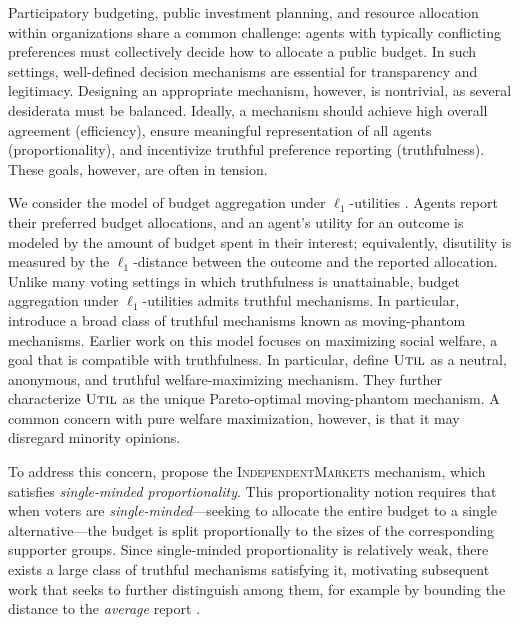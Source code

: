 \documentclass[11pt]{article}
\newcommand{\IM}{\textsc{IndependentMarkets} }
\newcommand{\Ut}{\textsc{Util} }
\begin{document}
Participatory budgeting, public investment planning, and resource allocation within organizations share a common challenge: agents with typically conflicting preferences must collectively decide how to allocate a public budget. In such settings, well-defined decision mechanisms are essential for transparency and legitimacy. Designing an appropriate mechanism, however, is nontrivial, as several desiderata must be balanced. Ideally, a mechanism should achieve high overall agreement (efficiency), ensure meaningful representation of all agents (proportionality), and incentivize truthful preference reporting (truthfulness). These goals, however, are often in tension.


We consider the model of budget aggregation under $\ell_1$-utilities \cite{lindner2008midpoint,goel2019knapsack}. Agents report their preferred budget allocations, and an agent’s utility for an outcome is modeled by the amount of budget spent in their interest; equivalently, disutility is measured by the $\ell_1$-distance between the outcome and the reported allocation. 
Unlike many voting settings in which truthfulness is unattainable, budget aggregation under $\ell_1$-utilities admits truthful mechanisms. In particular, \citet{freeman2021truthful} introduce a broad class of truthful mechanisms known as moving-phantom mechanisms.
Earlier work on this model \cite{lindner2008midpoint,goel2019knapsack} focuses on maximizing social welfare, a goal that is compatible with truthfulness. In particular, \citet{freeman2021truthful} define $\Ut$ as a neutral, anonymous, and truthful welfare-maximizing mechanism. They further characterize $\Ut$ as the unique Pareto-optimal moving-phantom mechanism. A common concern with pure welfare maximization, however, is that it may disregard minority opinions.


To address this concern, \citet{freeman2021truthful} propose the \IM mechanism, which satisfies \emph{single-minded proportionality}. This proportionality notion requires that when voters are \emph{single-minded}—seeking to allocate the entire budget to a single alternative—the budget is split proportionally to the sizes of the corresponding supporter groups. Since single-minded proportionality is relatively weak, there exists a large class of truthful mechanisms satisfying it, motivating subsequent work that seeks to further distinguish among them, for example by bounding the distance to the \emph{average} report \cite{caragiannis2022truthful,freeman2024project}.
\end{document}
